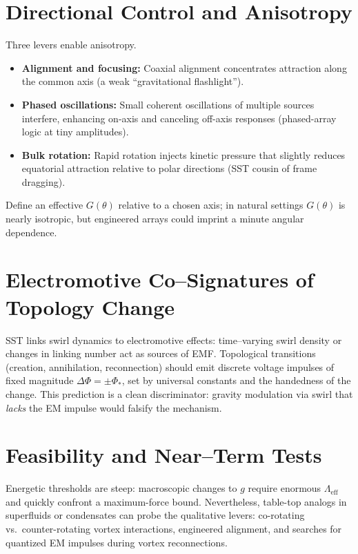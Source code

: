 \documentclass[11pt]{article}
\newcommand{\LambdaS}{\Lambda}
\begin{document}
    \section{Directional Control and Anisotropy}
        Three levers enable anisotropy.
        \begin{itemize}
            \item \textbf{Alignment and focusing:} Coaxial alignment concentrates attraction along the common axis (a weak ``gravitational flashlight'').
            \item \textbf{Phased oscillations:} Small coherent oscillations of multiple sources interfere, enhancing on-axis and canceling off-axis responses (phased-array logic at tiny amplitudes).
            \item \textbf{Bulk rotation:} Rapid rotation injects kinetic pressure that slightly reduces equatorial attraction relative to polar directions (SST cousin of frame dragging).
        \end{itemize}
        Define an effective $G(\theta)$ relative to a chosen axis; in natural settings $G(\theta)$ is nearly isotropic, but engineered arrays could imprint a minute angular dependence.

    \section{Electromotive Co–Signatures of Topology Change}
        SST links swirl dynamics to electromotive effects: time–varying swirl density or changes in linking number act as sources of EMF.
        Topological transitions (creation, annihilation, reconnection) should emit discrete voltage impulses of fixed magnitude $\Delta\Phi=\pm\Phi_\ast$, set by universal constants and the handedness of the change.
        This prediction is a clean discriminator: gravity modulation via swirl that \emph{lacks} the EM impulse would falsify the mechanism.

    \section{Feasibility and Near–Term Tests}
        Energetic thresholds are steep: macroscopic changes to $g$ require enormous $\LambdaS_{\text{eff}}$ and quickly confront a maximum-force bound.
        Nevertheless, table-top analogs in superfluids or condensates can probe the qualitative levers:
        co-rotating vs.\ counter-rotating vortex interactions, engineered alignment, and searches for quantized EM impulses during vortex reconnections.
\end{document}
